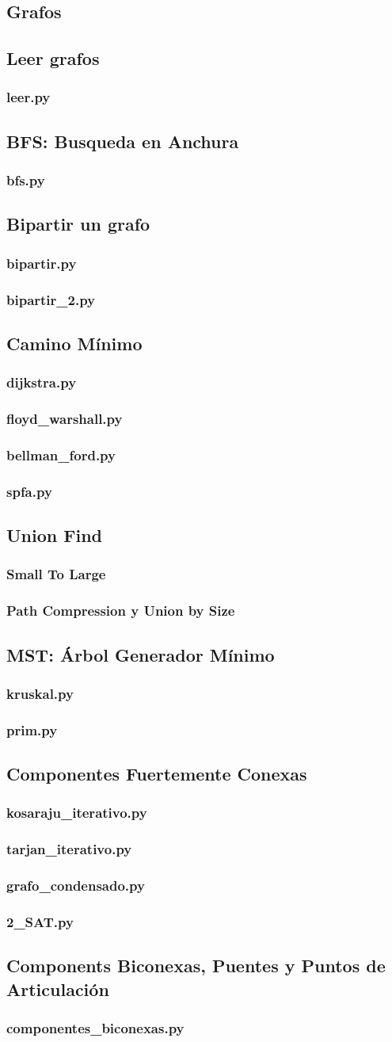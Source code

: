 \documentclass{article}
\newcommand\codefile[2]{    
    \subsubsection{#2}
    
    
}
\begin{document}
\begin{multicols*}{2}
\section{Grafos}
\subsection{Leer grafos}
\codefile{grafos/leer.py}{leer.py}

\subsection{BFS: Busqueda en Anchura}
\codefile{grafos/bfs.py}{bfs.py}

\subsection{Bipartir un grafo}
\codefile{grafos/bipartir.py}{bipartir.py}
\codefile{grafos/bipartir_2.py}{bipartir\_2.py}

\subsection{Camino Mínimo}
\codefile{grafos/dijkstra.py}{dijkstra.py}
\codefile{grafos/floyd_warshall.py}{floyd\_warshall.py}
\codefile{grafos/bellman_ford.py}{bellman\_ford.py}
\codefile{grafos/spfa.py}{spfa.py}

\subsection{Union Find}
\codefile{grafos/union_find_small_to_large.py}{Small To Large}
\codefile{grafos/union_find_optimo.py}{Path Compression y Union by Size}

\subsection{MST: Árbol Generador Mínimo}
\codefile{grafos/kruskal.py}{kruskal.py}
\codefile{grafos/prim.py}{prim.py}

\subsection{Componentes Fuertemente Conexas}
\codefile{grafos/kosaraju_iterativo.py}{kosaraju\_iterativo.py}
\codefile{grafos/tarjan_iterativo.py}{tarjan\_iterativo.py}
\codefile{grafos/grafo_condensado.py}{grafo\_condensado.py}
\codefile{grafos/2_SAT.py}{2\_SAT.py}

\subsection{Components Biconexas, Puentes y Puntos de Articulación}
\codefile{grafos/Componentes\_biconexas.py}{componentes\_biconexas.py}


\end{multicols*}
\end{document}
